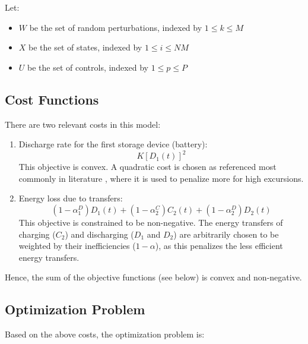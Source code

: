 \documentclass[conference]{IEEEtran}
\begin{document}
Let:
\begin{itemize}
	\item $W$ be the set of random perturbations, indexed by $1\leq k \leq M$
	\item $X$ be the set of states, indexed by $1\leq i \leq NM$
	\item $U$ be the set of controls, indexed by $1\leq p \leq P$
\end{itemize}

\subsection{Cost Functions}
There are two relevant costs in this model:
\begin{enumerate}
    \item Discharge rate for the first storage device (battery):
	\begin{equation}K\left[D_{1}(t)\right]^{2}\end{equation}
	This objective is convex. A quadratic cost is chosen as referenced most commonly in literature \cite{bambang2014energy}, where it is used to penalize more for high excursions.
	\item Energy loss due to transfers:
	\begin{equation}
        (1-\alpha_{1}^{D})D_{1}(t)+(1-\alpha_{2}^{C})C_{2}(t)+(1-\alpha_{2}^{D})D_{2}(t)
	\end{equation}
	This objective is constrained to be non-negative. The energy transfers of charging ($C_{2}$) and discharging ($D_{1}$ and $D_{2}$) are arbitrarily chosen to be weighted by their inefficiencies ($1-\alpha$), as this penalizes the less efficient energy transfers.
\end{enumerate}

Hence, the sum of the objective functions (see below) is convex and non-negative.

\subsection{Optimization Problem}
Based on the above costs, the optimization problem is:
\end{document}
